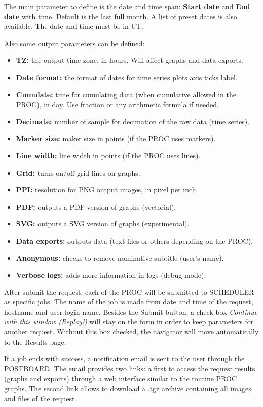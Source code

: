 The main parameter to define is the date and time span: \textbf{Start date} and \textbf{End date} with time. Default is the last full month. A list of preset dates is also available. The date and time must be in UT. 

Also some output parameters can be defined:
\begin{itemize}
\item \textbf{TZ:} the output time zone, in hours. Will affect graphs and data exports.
\item \textbf{Date format:} the format of dates for time series plots axis ticks label.
\item \textbf{Cumulate:} time for cumulating data (when cumulative allowed in the PROC), in day. Use fraction or any arithmetic formula if needed.
\item \textbf{Decimate:} number of sample for decimation of the raw data (time series).
\item \textbf{Marker size:} maker size in points (if the PROC uses markers).
\item \textbf{Line width:} line width in points (if the PROC uses lines).
\item \textbf{Grid:} turns on/off grid lines on graphs.
\item \textbf{PPI:} resolution for PNG output images, in pixel per inch.
\item \textbf{PDF:} outputs a PDF version of graphs (vectorial).
\item \textbf{SVG:} outputs a SVG version of graphs (experimental).
\item \textbf{Data exports:} outputs data (text files or others depending on the PROC).
\item \textbf{Anonymous:} checks to remove nominative subtitle (user's name).
\item \textbf{Verbose logs:} adds more information in logs (debug mode).
\end{itemize}

After submit the request, each of the PROC will be submitted to SCHEDULER as specific jobs. The name of the job is made from date and time of the request, hostname and user login name. Besides the Submit button, a check box \textit{Continue with this window (Replay!)} will stay on the form in order to keep parameters for another request. Without this box checked, the navigator will move automatically to the Results page.

If a job ends with success, a notification email is sent to the user through the POSTBOARD. The email provides two links: a first to access the request results (graphs and exports) through a web interface similar to the routine PROC graphs. The second link allows to download a .tgz archive containing all images and files of the request.

